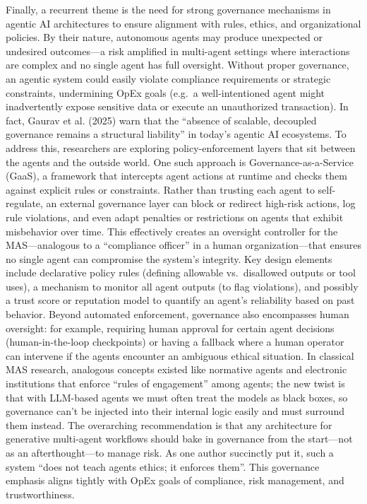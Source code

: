Finally, a recurrent theme is the need for strong governance mechanisms in agentic AI architectures to ensure alignment with rules, ethics, and organizational policies. By their nature, autonomous agents may produce unexpected or undesired outcomes—a risk amplified in multi-agent settings where interactions are complex and no single agent has full oversight. Without proper governance, an agentic system could easily violate compliance requirements or strategic constraints, undermining OpEx goals (e.g.~a well-intentioned agent might inadvertently expose sensitive data or execute an unauthorized transaction). In fact, Gaurav et al. (2025) warn that the “absence of scalable, decoupled governance remains a structural liability” in today's agentic AI ecosystems. To address this, researchers are exploring policy-enforcement layers that sit between the agents and the outside world. One such approach is Governance-as-a-Service (GaaS), a framework that intercepts agent actions at runtime and checks them against explicit rules or constraints. Rather than trusting each agent to self-regulate, an external governance layer can block or redirect high-risk actions, log rule violations, and even adapt penalties or restrictions on agents that exhibit misbehavior over time. This effectively creates an oversight controller for the MAS—analogous to a “compliance officer” in a human organization—that ensures no single agent can compromise the system's integrity. Key design elements include declarative policy rules (defining allowable vs.~disallowed outputs or tool uses), a mechanism to monitor all agent outputs (to flag violations), and possibly a trust score or reputation model to quantify an agent's reliability based on past behavior. Beyond automated enforcement, governance also encompasses human oversight: for example, requiring human approval for certain agent decisions (human-in-the-loop checkpoints) or having a fallback where a human operator can intervene if the agents encounter an ambiguous ethical situation. In classical MAS research, analogous concepts existed like normative agents and electronic institutions that enforce “rules of engagement” among agents; the new twist is that with LLM-based agents we must often treat the models as black boxes, so governance can't be injected into their internal logic easily and must surround them instead. The overarching recommendation is that any architecture for generative multi-agent workflows should bake in governance from the start—not as an afterthought—to manage risk. As one author succinctly put it, such a system “does not teach agents ethics; it enforces them”. This governance emphasis aligns tightly with OpEx goals of compliance, risk management, and trustworthiness.

